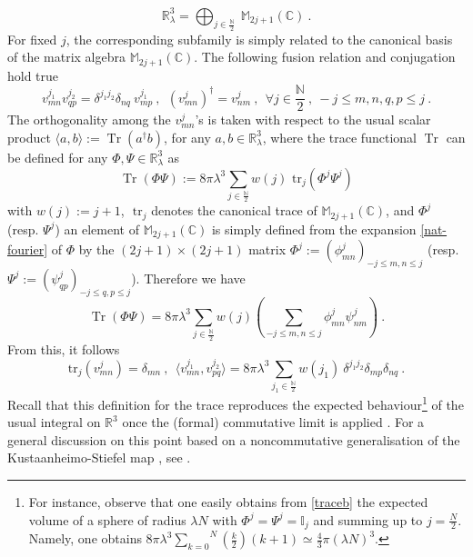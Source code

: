 \documentclass[a4paper,11pt,twoside]{article}
\numberwithin{equation}{section}
\newcommand\bbone{{ \mathbb{I}}}
\DeclareMathOperator{\tr}{Tr}
\theoremstyle{nonumberplain}
\newcounter{and}
\begin{document}
%
\begin{equation*}
\mathbb{R}^3_\lambda = \bigoplus_{j\in\frac{\mathbb{N}}{2}} \ \mathbb{M}_{2j+1}(\mathbb{C}) \ . 
\end{equation*}
%
For fixed $j$, the corresponding subfamily is simply related to the canonical basis of the matrix algebra $\mathbb{M}_{2j+1}(\mathbb{C})$. The following fusion relation and conjugation hold true%
%
\begin{equation}
v^{j_1}_{mn} v^{j_2}_{qp} = \delta^{j_1j_2} \delta_{nq} \ v^{j_1}_{mp} \ , \ \ (v^j_{mn})^\dag=v^j_{nm} \ , \ \ 
\forall j\in\frac{\mathbb{N}}{2} \ , \ -j\le m,n,q,p\le j \ . \label{fusion}
\end{equation}
%
The orthogonality among the $v^j_{mn}$'s is taken with respect to the usual scalar product $\langle a,b\rangle:=\tr(a^\dag b)$, for any $a,b\in\mathbb{R}^3_\lambda$, where the trace functional $\tr$ can be defined \cite{gervitwal-13} for any $\Phi,\Psi\in\mathbb{R}^3_\lambda$ as%
%
\begin{equation*}
\tr(\Phi\Psi) := 8 \pi \lambda^3 \sum_{j\in\frac{\mathbb{N}}{2}} w(j) \mbox{ tr}_j(\Phi^j\Psi^j)
\end{equation*}
%
with $w(j) := j+1$, $\mbox{ tr}_j$ denotes the canonical trace of $\mathbb{M}_{2j+1}(\mathbb{C})$, and $\Phi^j$ (resp. $\Psi^j$) an element of $\mathbb{M}_{2j+1}(\mathbb{C})$ is simply defined from the expansion \eqref{nat-fourier} of $\Phi$ by the $(2j+1)\times(2j+1)$ matrix $\Phi^j:=(\phi^j_{mn})_{-j\le m,n\le j}$ (resp. $\Psi^j:= (\psi^j_{qp})_{-j\le q,p\le j}$). Therefore we have%
%
\begin{equation}
\tr(\Phi\Psi)  = 8 \pi \lambda^3 \sum_{j\in\frac{\mathbb{N}}{2}} w(j) \left( \sum_{-j\le m,n\le j}\phi^j_{mn}\psi^j_{nm}\right) \ . \label{traceb} 
\end{equation}
%
From this, it follows%
%
\begin{equation}
\mbox{tr}_j(v^j_{mn}) = \delta_{mn} \ , \ \
\langle v^{j_1}_{mn} , v^{j_2}_{pq} \rangle = 8 \pi \lambda^3 \sum_{j_1\in\frac{\mathbb{N}}{2}} w(j_1) \ \delta^{j_1j_2} \delta_{mp} \delta_{nq} \ . \label{ortho-normaliz}
\end{equation}
%
Recall that this definition for the trace reproduces the expected behaviour{\footnote{For instance, observe that one easily obtains from \eqref{traceb} the expected volume of a sphere of radius $\lambda N$ with $\Phi^j=\Psi^j=\bbone_j$ and summing up to $j=\frac{N}{2}$. Namely, one obtains $8\pi\lambda^3\overset{N}{\underset{k=0}{\sum}}\left(\frac{k}{2}\right)(k+1)\simeq\frac43\pi\left(\lambda N\right)^3$.}} of the usual integral on $\mathbb{R}^3$ once the (formal) commutative limit is applied \cite{gervitwal-13}. For a general discussion on this point based on a noncommutative generalisation of the Kustaanheimo-Stiefel map \cite{ksmap}, see \cite{pv-ksmap}. \par%
\end{document}
